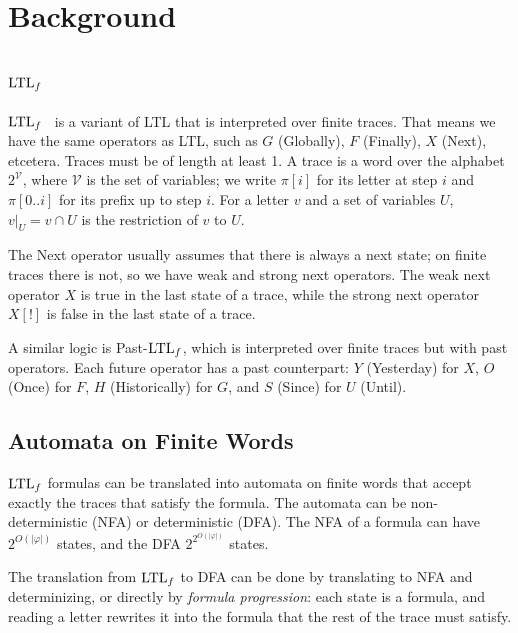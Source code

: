 \section{Background}\label{sec:background}

\subsection{\texorpdfstring{$\text{LTL}_f$}{LTLf}}

$\text{LTL}_f$~\cite{DeGiacomoVardi2013} is a variant of LTL that is interpreted over finite traces.
That means we have the same operators as LTL, such as $G$ (Globally), $F$ (Finally), $X$ (Next), etcetera.
Traces must be of length at least 1.
A trace is a word over the alphabet $2^{\mathcal{V}}$, where $\mathcal{V}$ is the set of variables; we write $\pi[i]$ for its letter at step $i$ and $\pi[0..i]$ for its prefix up to step $i$.
For a letter $v$ and a set of variables $U$, $v|_U = v \cap U$ is the restriction of $v$ to $U$.

The Next operator usually assumes that there is always a next state; on finite traces there is not, so we have weak and strong next operators.
The weak next operator $X$ is true in the last state of a trace, while the strong next operator $X[!]$ is false in the last state of a trace.

A similar logic is Past-$\text{LTL}_f$, which is interpreted over finite traces but with past operators.
Each future operator has a past counterpart: $Y$ (Yesterday) for $X$, $O$ (Once) for $F$, $H$ (Historically) for $G$, and $S$ (Since) for $U$ (Until).

\subsection{Automata on Finite Words}

$\text{LTL}_f$ formulas can be translated into automata on finite words that accept exactly the traces that satisfy the formula.
The automata can be non-deterministic (NFA) or deterministic (DFA).
The NFA of a formula can have $2^{O(|\varphi|)}$ states, and the DFA $2^{2^{O(|\varphi|)}}$ states.

The translation from $\text{LTL}_f$ to DFA can be done by translating to NFA and determinizing, or directly by \emph{formula progression}: each state is a formula, and reading a letter rewrites it into the formula that the rest of the trace must satisfy.

